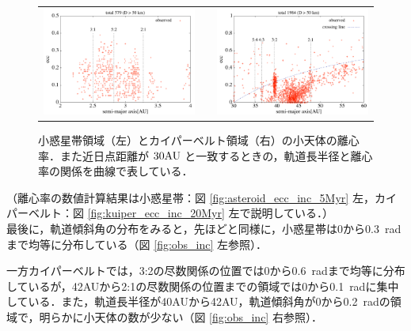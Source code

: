 \documentclass[11pt,a4paper,oneside,onecolumn]{jreport}
\begin{document}
\begin{figure}[H]
\begin{tabular}{ccc}
\begin{minipage}[t]{0.45\hsize}
\centering
\includegraphics[width=8cm]{./image/mainbelt_ecc.pdf}
\end{minipage} &
\begin{minipage}[t]{0.1\hsize}
\end{minipage} &
\begin{minipage}[t]{0.45\hsize}
\centering
\includegraphics[width=8cm]{./image/kuiperbelt_ecc.pdf}
\end{minipage}\\
%
\end{tabular}
\caption{小惑星帯領域（左）とカイパーベルト領域（右）の小天体の離心率．また近日点距離が $30 {\rm AU}$ と一致するときの，軌道長半径と離心率の関係を曲線で表している．\label{fig:obs_ecc}}
\end{figure}

（離心率の数値計算結果は小惑星帯：図 \ref{fig:asteroid_ecc_inc_5Myr} 左，カイパーベルト：図 \ref{fig:kuiper_ecc_inc_20Myr} 左で説明している．）
\\

最後に，軌道傾斜角の分布をみると，先ほどと同様に，小惑星帯は0から0.3\ radまで均等に分布している（図 \ref{fig:obs_inc} 左参照）．

一方カイパーベルトでは，3:2の尽数関係の位置では0から0.6\ radまで均等に分布しているが，42AUから2:1の尽数関係の位置までの領域では0から0.1\ radに集中している．また，軌道長半径が40AUから42AU，軌道傾斜角が0から0.2\ radの領域で，明らかに小天体の数が少ない（図 \ref{fig:obs_inc} 右参照）．
\end{document}
